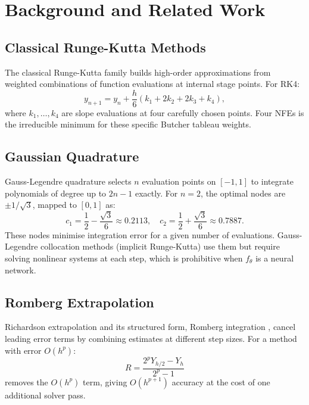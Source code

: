 \documentclass[conference]{IEEEtran}
\begin{document}
\section{Background and Related Work}
\label{sec:background}

\subsection{Classical Runge-Kutta Methods}

The classical Runge-Kutta family \cite{runge1895, kutta1901} builds
high-order approximations from weighted combinations of function
evaluations at internal stage points. For RK4:
%
\begin{equation}
    y_{n+1} = y_n + \frac{h}{6}(k_1 + 2k_2 + 2k_3 + k_4),
\end{equation}
%
where $k_1, \ldots, k_4$ are slope evaluations at four carefully chosen
points. Four NFEs is the irreducible minimum for these specific Butcher
tableau weights.

\subsection{Gaussian Quadrature}

Gauss-Legendre quadrature \cite{gauss1814} selects $n$ evaluation points
on $[-1,1]$ to integrate polynomials of degree up to $2n-1$ exactly.
For $n=2$, the optimal nodes are $\pm 1/\sqrt{3}$, mapped to $[0,1]$ as:
%
\begin{equation}
    c_1 = \frac{1}{2} - \frac{\sqrt{3}}{6} \approx 0.2113,
    \quad
    c_2 = \frac{1}{2} + \frac{\sqrt{3}}{6} \approx 0.7887.
\end{equation}
%
These nodes minimise integration error for a given number of evaluations.
Gauss-Legendre collocation methods (implicit Runge-Kutta) use them but
require solving nonlinear systems at each step, which is prohibitive
when $f_\theta$ is a neural network.

\subsection{Romberg Extrapolation}

Richardson extrapolation \cite{richardson1911} and its structured form,
Romberg integration \cite{romberg1955}, cancel leading error terms by
combining estimates at different step sizes. For a method with error
$O(h^p)$:
%
\begin{equation}
    R = \frac{2^p Y_{h/2} - Y_h}{2^p - 1}
\end{equation}
%
removes the $O(h^p)$ term, giving $O(h^{p+1})$ accuracy at the cost
of one additional solver pass.
\end{document}
